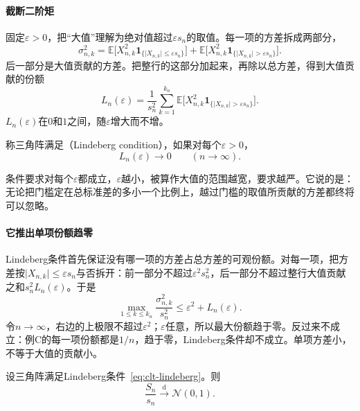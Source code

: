 \paragraph{截断二阶矩}
固定$\varepsilon>0$，把“大值”理解为绝对值超过$\varepsilon s_n$的取值。每一项的方差拆成两部分，
\[
 \sigma_{n,k}^2=\mathbb{E}\bigl[X_{n,k}^2\mathbf{1}_{\{\lvert X_{n,k}\rvert\leq\varepsilon s_n\}}\bigr]+\mathbb{E}\bigl[X_{n,k}^2\mathbf{1}_{\{\lvert X_{n,k}\rvert>\varepsilon s_n\}}\bigr] .
\]
后一部分是大值贡献的方差。把整行的这部分加起来，再除以总方差，得到大值贡献的份额
\begin{equation}
 L_n(\varepsilon)=\frac{1}{s_n^2}\sum_{k=1}^{k_n}\mathbb{E}\bigl[X_{n,k}^2\mathbf{1}_{\{\lvert X_{n,k}\rvert>\varepsilon s_n\}}\bigr] .
 \label{eq:clt-lindeberg-ratio}
\end{equation}
$L_n(\varepsilon)$在$0$和$1$之间，随$\varepsilon$增大而不增。

\begin{definition}[Lindeberg条件]
\label{def:clt-lindeberg}
称三角阵满足（Lindeberg condition），如果对每个$\varepsilon>0$，
\begin{equation}
 L_n(\varepsilon)\to0\qquad(n\to\infty) .
 \label{eq:clt-lindeberg}
\end{equation}
\end{definition}

条件要求对每个$\varepsilon$都成立，$\varepsilon$越小，被算作大值的范围越宽，要求越严。它说的是：无论把门槛定在总标准差的多小一个比例上，越过门槛的取值所贡献的方差都终将可以忽略。

\paragraph{它推出单项份额趋零}
Lindeberg条件首先保证没有哪一项的方差占总方差的可观份额。对每一项，把方差按$\lvert X_{n,k}\rvert\leq\varepsilon s_n$与否拆开：前一部分不超过$\varepsilon^2s_n^2$，后一部分不超过整行大值贡献之和$s_n^2L_n(\varepsilon)$。于是
\begin{equation}
 \max_{1\leq k\leq k_n}\frac{\sigma_{n,k}^2}{s_n^2}\leq\varepsilon^2+L_n(\varepsilon) .
 \label{eq:clt-max-share}
\end{equation}
令$n\to\infty$，右边的上极限不超过$\varepsilon^2$；$\varepsilon$任意，所以最大份额趋于零。反过来不成立：例C的每一项份额都是$1/n$，趋于零，Lindeberg条件却不成立。单项方差小，不等于大值的贡献小。

\begin{theorem}[Lindeberg中心极限定理]
\label{thm:clt-lindeberg}
设三角阵满足Lindeberg条件~\eqref{eq:clt-lindeberg}。则
\begin{equation}
 \frac{S_n}{s_n}\xrightarrow{\mathrm{d}}\mathcal{N}(0,1) .
 \label{eq:clt-lindeberg-limit}
\end{equation}
\end{theorem}

